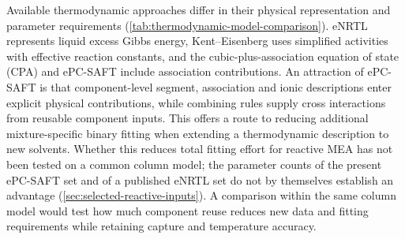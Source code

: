Available thermodynamic approaches differ in their physical representation and parameter requirements (\cref{tab:thermodynamic-model-comparison}).
eNRTL represents liquid excess Gibbs energy, Kent--Eisenberg uses simplified activities with effective reaction constants, and the cubic-plus-association equation of state (CPA) and ePC-SAFT include association contributions.
An attraction of ePC-SAFT is that component-level segment, association and ionic descriptions enter explicit physical contributions, while combining rules supply cross interactions from reusable component inputs.
This offers a route to reducing additional mixture-specific binary fitting when extending a thermodynamic description to new solvents.
Whether this reduces total fitting effort for reactive MEA has not been tested on a common column model; the parameter counts of the present ePC-SAFT set and of a published eNRTL set \cite{Akula2023a} do not by themselves establish an advantage (\cref{sec:selected-reactive-inputs}). A comparison within the same column model would test how much component reuse reduces new data and fitting requirements while retaining capture and temperature accuracy.

